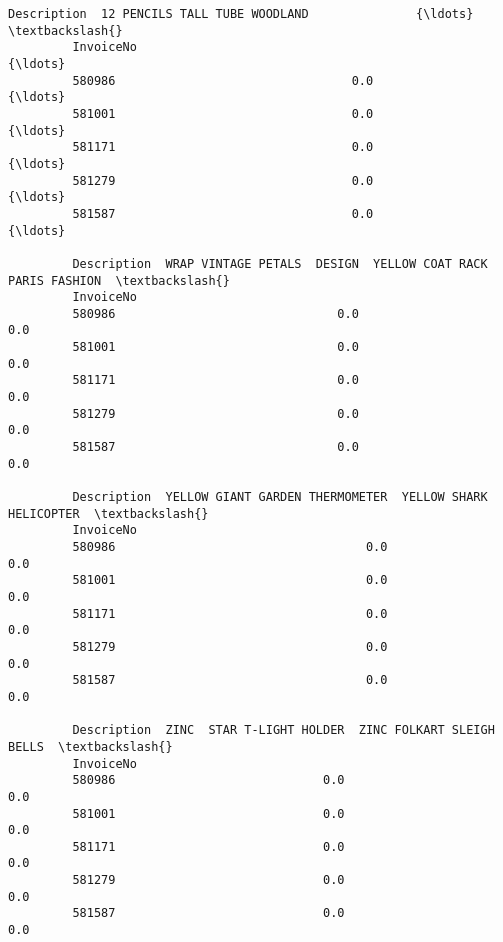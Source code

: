\documentclass[11pt]{article}
\begin{document}
\begin{Verbatim}[commandchars=\\\{\}]
         Description  12 PENCILS TALL TUBE WOODLAND               {\ldots}                 \textbackslash{}
         InvoiceNo                                                {\ldots}                  
         580986                                 0.0               {\ldots}                  
         581001                                 0.0               {\ldots}                  
         581171                                 0.0               {\ldots}                  
         581279                                 0.0               {\ldots}                  
         581587                                 0.0               {\ldots}                  
         
         Description  WRAP VINTAGE PETALS  DESIGN  YELLOW COAT RACK PARIS FASHION  \textbackslash{}
         InvoiceNo                                                                  
         580986                               0.0                             0.0   
         581001                               0.0                             0.0   
         581171                               0.0                             0.0   
         581279                               0.0                             0.0   
         581587                               0.0                             0.0   
         
         Description  YELLOW GIANT GARDEN THERMOMETER  YELLOW SHARK HELICOPTER  \textbackslash{}
         InvoiceNo                                                               
         580986                                   0.0                      0.0   
         581001                                   0.0                      0.0   
         581171                                   0.0                      0.0   
         581279                                   0.0                      0.0   
         581587                                   0.0                      0.0   
         
         Description  ZINC  STAR T-LIGHT HOLDER  ZINC FOLKART SLEIGH BELLS  \textbackslash{}
         InvoiceNo                                                           
         580986                             0.0                        0.0   
         581001                             0.0                        0.0   
         581171                             0.0                        0.0   
         581279                             0.0                        0.0   
         581587                             0.0                        0.0   
         

\end{Verbatim}
\end{document}
